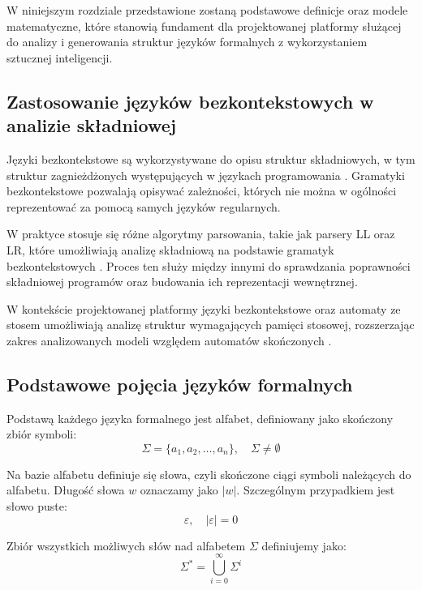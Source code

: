 \documentclass[12pt]{article}
\begin{document}
W niniejszym rozdziale przedstawione zostaną podstawowe definicje oraz modele matematyczne, które stanowią fundament dla projektowanej platformy służącej do analizy i generowania struktur języków formalnych z wykorzystaniem sztucznej inteligencji.

\subsection{Zastosowanie języków bezkontekstowych w analizie składniowej}

Języki bezkontekstowe są wykorzystywane do opisu struktur składniowych, w tym struktur zagnieżdżonych występujących w językach programowania \cite{hopcroft2007,sipser2012,aho1972}. Gramatyki bezkontekstowe pozwalają opisywać zależności, których nie można w ogólności reprezentować za pomocą samych języków regularnych.

W praktyce stosuje się różne algorytmy parsowania, takie jak parsery LL oraz LR, które umożliwiają analizę składniową na podstawie gramatyk bezkontekstowych \cite{aho1972}. Proces ten służy między innymi do sprawdzania poprawności składniowej programów oraz budowania ich reprezentacji wewnętrznej.

W kontekście projektowanej platformy języki bezkontekstowe oraz automaty ze stosem umożliwiają analizę struktur wymagających pamięci stosowej, rozszerzając zakres analizowanych modeli względem automatów skończonych \cite{hopcroft2007,sipser2012}.

\subsection{Podstawowe pojęcia języków formalnych}

Podstawą każdego języka formalnego jest alfabet, definiowany jako skończony zbiór symboli:
\begin{equation}
\Sigma = \{ a_1, a_2, \dots, a_n \}, \quad \Sigma \neq \emptyset
\end{equation}

Na bazie alfabetu definiuje się słowa, czyli skończone ciągi symboli należących do alfabetu. Długość słowa $w$ oznaczamy jako $|w|$. Szczególnym przypadkiem jest słowo puste:
\begin{equation}
\varepsilon, \quad |\varepsilon| = 0
\end{equation}

Zbiór wszystkich możliwych słów nad alfabetem $\Sigma$ definiujemy jako:
\begin{equation}
\Sigma^* = \bigcup_{i=0}^{\infty} \Sigma^i
\end{equation}
\end{document}
